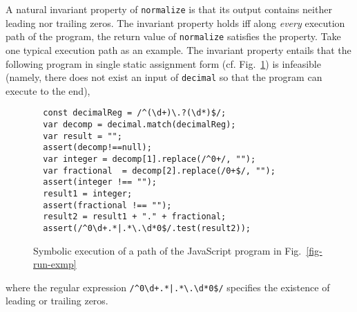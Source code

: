 A natural invariant property of {\tt normalize} is that its output contains neither leading nor trailing zeros. The invariant property holds iff  along \emph{every} execution path of the program, the return value of {\tt normalize} satisfies the property. 
%
Take one typical execution path as an example. %
The invariant property entails that the following program in single static assignment form (cf. Fig.~\ref{fig-run-exmp-path}) is infeasible (namely, there does not exist an input of {\tt decimal} so that the program can execute to the end), 
\begin{figure}[htbp]
\begin{center}
\begin{verbatim}
  const decimalReg = /^(\d+)\.?(\d*)$/;
  var decomp = decimal.match(decimalReg);
  var result = "";
  assert(decomp!==null);
  var integer = decomp[1].replace(/^0+/, "");
  var fractional  = decomp[2].replace(/0+$/, "");
  assert(integer !== ""); 
  result1 = integer;
  assert(fractional !== ""); 
  result2 = result1 + "." + fractional;
  assert(/^0\d+.*|.*\.\d*0$/.test(result2));
\end{verbatim}
\end{center}
\label{fig-run-exmp-path}
\caption{Symbolic execution of a path of the JavaScript program in Fig.~\ref{fig-run-exmp}}
\end{figure}
where the regular expression {\tt /\^{}0\textbackslash d+.*|.*{\footnotesize\textbackslash}.\textbackslash d*0\$/} specifies the existence of leading or trailing zeros.

